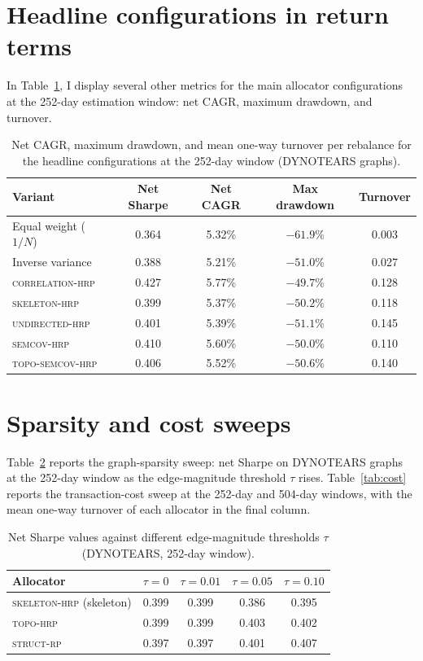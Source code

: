 \documentclass[11pt, a4paper]{report}
\newcommand{\corrhrp}{\textsc{correlation-hrp}}
\newcommand{\skelhrp}{\textsc{skeleton-hrp}}
\newcommand{\undirhrp}{\textsc{undirected-hrp}}
\newcommand{\semcovhrp}{\textsc{semcov-hrp}}
\newcommand{\topohrp}{\textsc{topo-hrp}}
\newcommand{\toposemcovhrp}{\textsc{topo-semcov-hrp}}
\newcommand{\structrp}{\textsc{struct-rp}}
\begin{document}
\section{Headline configurations in return terms}

In Table~\ref{tab:return-terms}, I display several other metrics for the main allocator configurations at the 252-day estimation window: net CAGR, maximum drawdown, and
turnover.

\begin{table}[htbp]
  \centering
  \caption{Net CAGR, maximum drawdown, and mean one-way turnover per rebalance for the headline configurations at the 252-day window (DYNOTEARS graphs).}
  \label{tab:return-terms}
  \begin{tabular}{l c c c c}
    \toprule
    Variant & Net Sharpe & Net CAGR & Max drawdown & Turnover \\
    \midrule
    Equal weight ($1/N$) & 0.364 & 5.32\% & $-61.9$\% & 0.003 \\
    Inverse variance     & 0.388 & 5.21\% & $-51.0$\% & 0.027 \\
    \corrhrp{}       & 0.427 & 5.77\% & $-49.7$\% & 0.128 \\
    \skelhrp{}  & 0.399 & 5.37\% & $-50.2$\% & 0.118 \\
    \undirhrp{}   & 0.401 & 5.39\% & $-51.1$\% & 0.145 \\
    \semcovhrp{}   & 0.410 & 5.60\% & $-50.0$\% & 0.110 \\
    \toposemcovhrp{} & 0.406 & 5.52\% & $-50.6$\% & 0.140 \\
    \bottomrule
  \end{tabular}
\end{table}

\section{Sparsity and cost sweeps}

Table~\ref{tab:tau} reports the graph-sparsity sweep: net Sharpe on
DYNOTEARS graphs at the 252-day window as the edge-magnitude threshold
$\tau$ rises. Table~\ref{tab:cost} reports the transaction-cost sweep at
the 252-day and 504-day windows, with the mean one-way turnover of each
allocator in the final column.

\begin{table}[htbp]
  \centering
  \caption{Net Sharpe values against different edge-magnitude thresholds $\tau$ (DYNOTEARS, 252-day window).}
  \label{tab:tau}
  \begin{tabular}{l c c c c}
    \toprule
    Allocator & $\tau=0$ & $\tau=0.01$ & $\tau=0.05$ & $\tau=0.10$ \\
    \midrule
    \skelhrp{} (skeleton) & 0.399 & 0.399 & 0.386 & 0.395 \\
    \topohrp{}            & 0.399 & 0.399 & 0.403 & 0.402 \\
    \structrp{}           & 0.397 & 0.397 & 0.401 & 0.407 \\
    \bottomrule
  \end{tabular}
\end{table}
\end{document}
